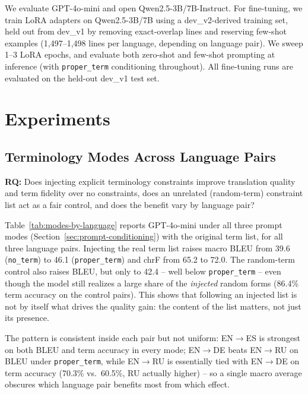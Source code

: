 \documentclass[11pt]{article}
\begin{document}
We evaluate GPT-4o-mini and open Qwen2.5-3B/7B-Instruct. For fine-tuning, we train LoRA adapters on Qwen2.5-3B/7B using a dev\_v2-derived training set, held out from dev\_v1 by removing exact-overlap lines and reserving few-shot examples (1{,}497--1{,}498 lines per language, depending on language pair). We sweep 1--3 LoRA epochs, and evaluate both zero-shot and few-shot prompting at inference (with \texttt{proper\_term} conditioning throughout). All fine-tuning runs are evaluated on the held-out dev\_v1 test set.

\section{Experiments}
\label{sec:experiments}

\subsection{Terminology Modes Across Language Pairs}
\label{sec:exp-language-pairs}

\textbf{RQ:} Does injecting explicit terminology constraints improve translation quality and term fidelity over no constraints, does an unrelated (random-term) constraint list act as a fair control, and does the benefit vary by language pair?

Table~\ref{tab:modes-by-language} reports GPT-4o-mini under all three prompt modes (Section~\ref{sec:prompt-conditioning}) with the original term list, for all three language pairs. Injecting the real term list raises macro BLEU from 39.6 (\texttt{no\_term}) to 46.1 (\texttt{proper\_term}) and chrF from 65.2 to 72.0. The random-term control also raises BLEU, but only to 42.4 -- well below \texttt{proper\_term} -- even though the model still realizes a large share of the \emph{injected} random forms (86.4\% term accuracy on the control pairs). This shows that following an injected list is not by itself what drives the quality gain: the content of the list matters, not just its presence.

The pattern is consistent inside each pair but not uniform: EN$\rightarrow$ES is strongest on both BLEU and term accuracy in every mode; EN$\rightarrow$DE beats EN$\rightarrow$RU on BLEU under \texttt{proper\_term}, while EN$\rightarrow$RU is essentially tied with EN$\rightarrow$DE on term accuracy (70.3\% vs.\ 60.5\%, RU actually higher) -- so a single macro average obscures which language pair benefits most from which effect.
\end{document}
